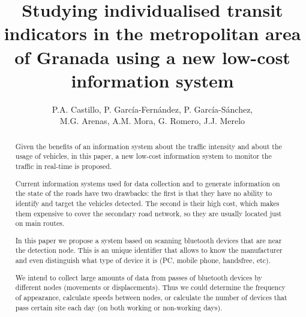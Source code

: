 \documentclass{llncs}
\title{Studying individualised transit indicators in the metropolitan area of Granada using a new low-cost information system}
\author {
P.A. Castillo, P. García-Fernández, P. García-Sánchez, \\ M.G. Arenas, A.M. Mora, G. Romero, J.J. Merelo
}
\institute{
Department of Architecture and Computer Technology. CITIC \\
University of Granada (Spain) \\
~\\
e-mail: {\tt pedro@atc.ugr.es}
}
\date{}
\begin{document}
\renewcommand{\tablename}{Table }
\renewcommand{\figurename}{Figure }
\maketitle

\begin{abstract}

Given the benefits of an information system about the traffic intensity and about the usage of vehicles, in this paper, a new low-cost information system to monitor the traffic in real-time is proposed.

Current information systems used for data collection and to generate information on the state of the roads have two drawbacks: the first is that they have no ability to identify and target the vehicles detected. 
The second is their high cost, which makes them expensive to cover the secondary road network, so they are usually located just on main routes.

In this paper we propose a system based on scanning bluetooth devices that are near the detection node. 
This is an unique identifier that allows to know the manufacturer and even distinguish what type of device it is (PC, mobile phone, handsfree, etc).

We intend to collect large amounts of data from passes of bluetooth devices by different nodes (movements or displacements). Thus we could determine the frequency of appearance, calculate speeds between nodes, or calculate the number of devices that pass certain site each day (on both working or non-working days).


\end{abstract}
\end{document}
